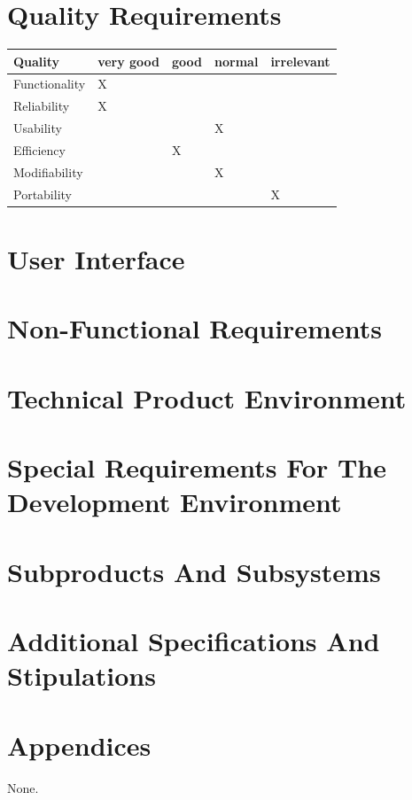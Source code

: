 \documentclass[11pt,a4paper,oneside,svgnames]{report}
\begin{document}
\chapter{Quality Requirements}
\begin{table}[h!]
 \begin{tabular}{lllll}
  \hline
  Quality & very good & good & normal & irrelevant \\
  \hline
  Functionality & X & & & \\
  Reliability & X & & & \\
  Usability & & & X & \\
  Efficiency & & X & & \\
  Modifiability & & & X & \\
  Portability & & & & X \\
  \hline
 \end{tabular}
\end{table}

\chapter{User Interface}
\chapter{Non-Functional Requirements}
\chapter{Technical Product Environment}
\chapter{Special Requirements For The Development Environment}
\chapter{Subproducts And Subsystems}
\chapter{Additional Specifications And Stipulations}
\chapter{Appendices}
None.
\end{document}
